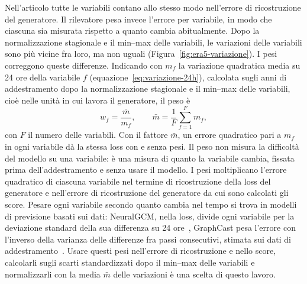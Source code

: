 Nell'articolo tutte le variabili contano allo stesso modo nell'errore di ricostruzione del generatore. Il rilevatore pesa invece l'errore per variabile, in modo che ciascuna sia misurata rispetto a quanto cambia abitualmente. Dopo la normalizzazione stagionale e il min--max delle variabili, le variazioni delle variabili sono più vicine fra loro, ma non uguali (Figura~\ref{fig:era5-variazione}). I pesi correggono queste differenze. Indicando con $m_f$ la variazione quadratica media su 24 ore della variabile $f$ (equazione~\eqref{eq:variazione-24h}), calcolata sugli anni di addestramento dopo la normalizzazione stagionale e il min--max delle variabili, cioè nelle unità in cui lavora il generatore, il peso è
\begin{equation}
w_f=\frac{\bar{m}}{m_f},
\qquad
\bar{m}=\frac{1}{F}\sum_{f=1}^{F}m_f,
\end{equation}
con $F$ il numero delle variabili. Con il fattore $\bar{m}$, un errore quadratico pari a $m_f$ in ogni variabile dà la stessa loss con e senza pesi. Il peso non misura la difficoltà del modello su una variabile: è una misura di quanto la variabile cambia, fissata prima dell'addestramento e senza usare il modello. I pesi moltiplicano l'errore quadratico di ciascuna variabile nel termine di ricostruzione della loss del generatore e nell'errore di ricostruzione del generatore da cui sono calcolati gli score. Pesare ogni variabile secondo quanto cambia nel tempo si trova in modelli di previsione basati sui dati: NeuralGCM, nella loss, divide ogni variabile per la deviazione standard della sua differenza su 24 ore~\cite{kochkov2024neuralgcm}, GraphCast pesa l'errore con l'inverso della varianza delle differenze fra passi consecutivi, stimata sui dati di addestramento~\cite{lam2023graphcast}. Usare questi pesi nell'errore di ricostruzione e nello score, calcolarli sugli scarti standardizzati dopo il min--max delle variabili e normalizzarli con la media $\bar{m}$ delle variazioni è una scelta di questo lavoro.

